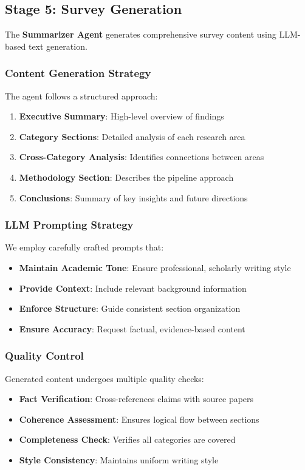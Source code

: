 \subsection{Stage 5: Survey Generation}

The \textbf{Summarizer Agent} generates comprehensive survey content using LLM-based text generation.

\subsubsection{Content Generation Strategy}

The agent follows a structured approach:
\begin{enumerate}
    \item \textbf{Executive Summary}: High-level overview of findings
    \item \textbf{Category Sections}: Detailed analysis of each research area
    \item \textbf{Cross-Category Analysis}: Identifies connections between areas
    \item \textbf{Methodology Section}: Describes the pipeline approach
    \item \textbf{Conclusions}: Summary of key insights and future directions
\end{enumerate}

\subsubsection{LLM Prompting Strategy}

We employ carefully crafted prompts that:
\begin{itemize}
    \item \textbf{Maintain Academic Tone}: Ensure professional, scholarly writing style
    \item \textbf{Provide Context}: Include relevant background information
    \item \textbf{Enforce Structure}: Guide consistent section organization
    \item \textbf{Ensure Accuracy}: Request factual, evidence-based content
\end{itemize}

\subsubsection{Quality Control}

Generated content undergoes multiple quality checks:
\begin{itemize}
    \item \textbf{Fact Verification}: Cross-references claims with source papers
    \item \textbf{Coherence Assessment}: Ensures logical flow between sections
    \item \textbf{Completeness Check}: Verifies all categories are covered
    \item \textbf{Style Consistency}: Maintains uniform writing style
\end{itemize}

